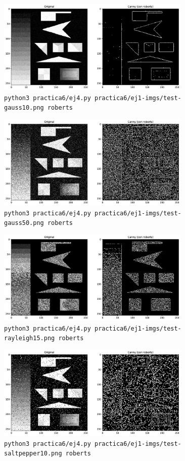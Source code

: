 \documentclass[11pt, spanish]{article}
\begin{document}
\begin{figure}[H]
\centering
    \includegraphics[height=4.5cm]{informe-imgs/ej4-roberts-test-gauss10.jpg}
    \caption{\texttt{python3 practica6/ej4.py practica6/ej1-imgs/test-gauss10.png roberts}}
\end{figure}

\begin{figure}[H]
\centering
    \includegraphics[height=4.5cm]{informe-imgs/ej4-roberts-test-gauss50.jpg}
    \caption{\texttt{python3 practica6/ej4.py practica6/ej1-imgs/test-gauss50.png roberts}}
\end{figure}

\begin{figure}[H]
\centering
    \includegraphics[height=4.5cm]{informe-imgs/ej4-roberts-test-rayleigh15.jpg}
    \caption{\texttt{python3 practica6/ej4.py practica6/ej1-imgs/test-rayleigh15.png roberts}}
\end{figure}

\begin{figure}[H]
\centering
    \includegraphics[height=4.5cm]{informe-imgs/ej4-roberts-test-saltpepper10.jpg}
    \caption{\texttt{python3 practica6/ej4.py practica6/ej1-imgs/test-saltpepper10.png roberts}}
\end{figure}
\end{document}

